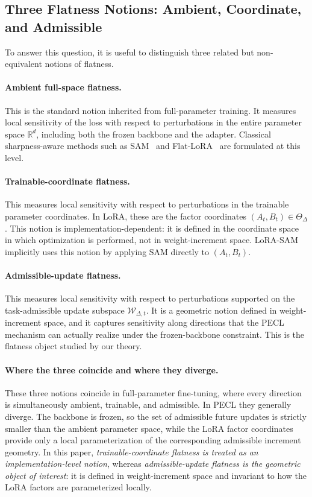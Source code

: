 \subsection{Three Flatness Notions: Ambient, Coordinate, and Admissible}
\label{sec:three-flatness}

To answer this question, it is useful to distinguish three related but non-equivalent notions of flatness.

\paragraph{Ambient full-space flatness.}
This is the standard notion inherited from full-parameter training.
It measures local sensitivity of the loss with respect to perturbations in the entire parameter space $\mathbb{R}^d$, including both the frozen backbone and the adapter.
Classical sharpness-aware methods such as SAM~\citep{foretSharpnessAwareMinimizationEfficiently2021} and Flat-LoRA~\citep{li2024flatlora} are formulated at this level.

\paragraph{Trainable-coordinate flatness.}
This measures local sensitivity with respect to perturbations in the trainable parameter coordinates.
In LoRA, these are the factor coordinates $(A_t, B_t) \in \Theta_\Delta$.
This notion is implementation-dependent: it is defined in the coordinate space in which optimization is performed, not in weight-increment space.
LoRA-SAM~\citep{NEURIPS2024_4eb2c0ad} implicitly uses this notion by applying SAM directly to $(A_t, B_t)$.

\paragraph{Admissible-update flatness.}
This measures local sensitivity with respect to perturbations supported on the task-admissible update subspace $\mathcal{W}_{\Delta,t}$.
It is a geometric notion defined in weight-increment space, and it captures sensitivity along directions that the PECL mechanism can actually realize under the frozen-backbone constraint.
This is the flatness object studied by our theory.

\paragraph{Where the three coincide and where they diverge.}
These three notions coincide in full-parameter fine-tuning, where every direction is simultaneously ambient, trainable, and admissible.
In PECL they generally diverge.
The backbone is frozen, so the set of admissible future updates is strictly smaller than the ambient parameter space, while the LoRA factor coordinates provide only a local parameterization of the corresponding admissible increment geometry.
In this paper, \emph{trainable-coordinate flatness is treated as an implementation-level notion}, whereas \emph{admissible-update flatness is the geometric object of interest}: it is defined in weight-increment space and invariant to how the LoRA factors are parameterized locally.

